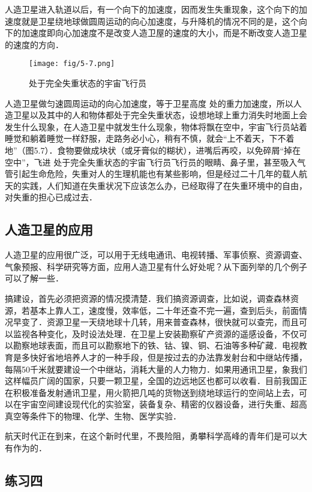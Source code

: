 人造卫星进入轨道以后，有一个向下的加速度，因而发生失重现象，这个向下的加速度就是卫星绕地球做圆周运动的向心加速度，与升降机的情况不同的是，这个向下的加速度即向心加速度不是改变人造卫屋的速度的大小，而是不断改变人造卫星的速度的方向．

\begin{figure}[htp]
\centering\texttt{[image: fig/5-7.png]}
\caption{处于完全失重状态的宇宙飞行员}
\end{figure}

人造卫星做匀速圆周运动的向心加速度，等于卫星高度
处的重力加速度，所以人造卫星以及其中的人和物体都处于完全失重状态，设想地球上重力消失时地面上会发生什么现象，在人造卫星中就发生什么现象，物体将飘在空中，宇宙飞行员站着睡觉和躺着睡觉一样舒服，走路务必小心，稍有不慎，就会“上不着天，下不着地”（图5.7）．食物要做成块状（或牙膏似的糊状），进嘴后再咬，以免碎屑“掉在空中”，飞进
处于完全失重状态的宇宙飞行员飞行员的眼睛、鼻子里，甚至吸入气管引起生命危险，失重对人的生理机能也有某些影响，但是经过二十几年的载人航天的实践，人们知道在失重状况下应该怎么办，已经取得了在失重环境中的自由，对失重的担心已成过去．

\subsection{人造卫星的应用}

人造卫星的应用很广泛，可以用于无线电通讯、电视转播、军事侦察、资源调查、气象预报、科学研究等方面，应用人造卫星有什么好处呢？从下面列举的几个例子可以了解一些．

搞建设，首先必须把资源的情况摸清楚．我们搞资源调查，比如说，调查森林资源，若基本上靠人工，速度慢，效率低，二十年还查不完一遍，查到后头，前面情况早变了．资源卫星一天绕地球十几转，用来普查森林，很快就可以查完，而且可
以监视各种变化，及时设法处理．在卫星上安装勘察矿产资源的遥感设备，不仅可以勘察地球表面，而且可以勘察地下的铁、钴、镍、铜、石油等多种矿藏．电视教育是多快好省地培养人才的一种手段，但是按过去的办法靠发射台和中继站传播，每隔50千米就要建设一个中继站，消耗大量的人力物力．如果用通讯卫星，象我们这样幅员广阔的国家，只要一颗卫星，全国的边远地区也都可以收看．目前我国正在积极准备发射通讯卫星，用火箭把几吨的货物送到绕地球运行的空间站上去，可以在宇宙空间建设现代化的实验室，装备复杂、精密的仪器设备，进行失重、超高真空等条件下的物理、化学、生物、医学实验．

航天时代正在到来，在这个新时代里，不畏险阻，勇攀科学高峰的青年们是可以大有作为的．	
	
\subsection*{练习四}

